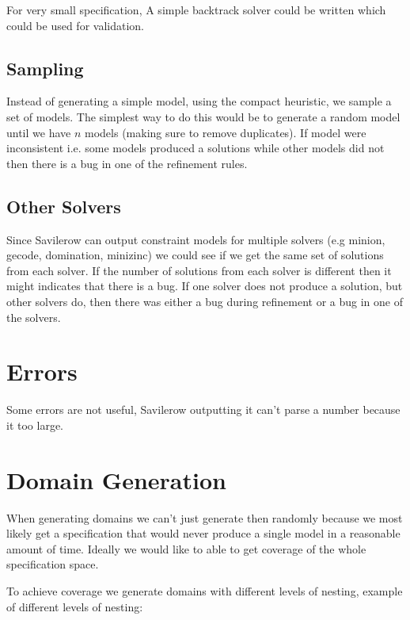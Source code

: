 For very small specification, A simple backtrack solver could be written which could be used for validation.

\subsection{Sampling}

Instead of generating a simple model, using the compact heuristic, we sample a set of models. The simplest way to do this would be to generate a random model until we have $n$ models (making sure to remove duplicates).  If model were inconsistent i.e. some models produced a solutions while other models did not then there is a bug in one of the refinement rules.

\subsection{Other Solvers}

Since Savilerow can output constraint models for multiple solvers (e.g minion, gecode, domination, minizinc) we could see if we get the same set of solutions from each solver. If the number of solutions from each solver is different then it might indicates that there is a bug.  If one solver does not produce a solution, but other solvers do, then there was either a bug during refinement or a bug in one of the solvers.

\section{Errors}

Some errors are not useful,  Savilerow outputting it can't parse a number because it too large. 

\section{Domain Generation}

When generating domains we can't just generate then randomly because we most likely get a specification that would never produce a single model in a reasonable amount of time.  Ideally we would like to able to get coverage of the whole specification space.  

To achieve coverage we generate domains with different levels of nesting, example of different levels of nesting:

